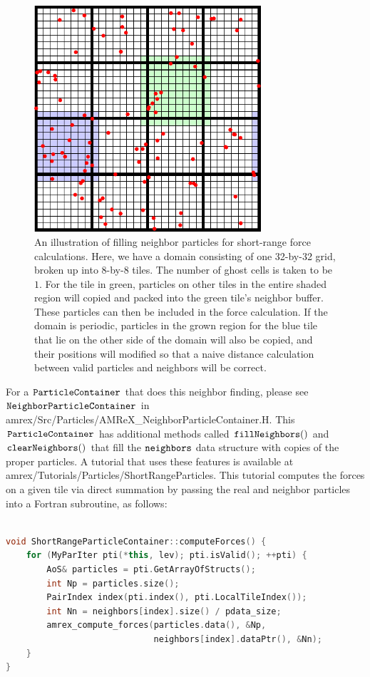 \begin{figure}
  \centering
  \includegraphics[width=0.75\textwidth]{./Particle/neighbor_particles.pdf}
  \caption{\label{fig:particles:neighbor_particles} An illustration of filling neighbor particles for short-range force calculations. Here, we have a domain consisting of one 32-by-32 grid, broken up into 8-by-8 tiles. The number of ghost cells is taken to be $1$. For the tile in green, particles on other tiles in the entire shaded region will copied and packed into the green tile's neighbor buffer. These particles can then be included in the force calculation. If the domain is periodic, particles in the grown region for the blue tile that lie on the other side of the domain will also be copied, and their positions will modified so that a naive distance calculation between valid particles and neighbors will be correct.
}
\end{figure}

For a $\tt{ParticleContainer}$ that does this neighbor finding, please see $\tt{NeighborParticleContainer}$ in amrex/Src/Particles/AMReX\_NeighborParticleContainer.H. This $\tt{ParticleContainer}$ has additional methods called $\tt{fillNeighbors()}$ and $\tt{clearNeighbors()}$ that fill the $\tt{neighbors}$ data structure with copies of the proper particles. A tutorial that uses these features is available at amrex/Tutorials/Particles/ShortRangeParticles. This tutorial computes the forces on a given tile via direct summation by passing the real and neighbor particles into a Fortran subroutine, as follows:

\begin{lstlisting}[language=cpp]

void ShortRangeParticleContainer::computeForces() {
    for (MyParIter pti(*this, lev); pti.isValid(); ++pti) {
        AoS& particles = pti.GetArrayOfStructs();
        int Np = particles.size();
        PairIndex index(pti.index(), pti.LocalTileIndex());
        int Nn = neighbors[index].size() / pdata_size;
        amrex_compute_forces(particles.data(), &Np,
                             neighbors[index].dataPtr(), &Nn);
    }
}

\end{lstlisting}

